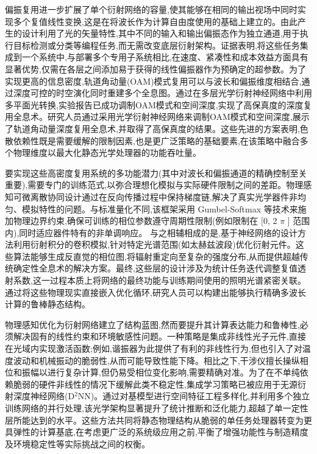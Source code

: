 \documentclass[11pt]{article}
\begin{document}
偏振复用进一步扩展了单个衍射网络的容量,使其能够在相同的输出视场中同时实现多个复值线性变换,这是在将波长作为计算自由度使用的基础上建立的。由此产生的设计利用了光的矢量特性,其中不同的输入和输出偏振态作为独立通道,用于执行目标检测或分类等编程任务,而无需改变底层衍射架构。证据表明,将这些任务集成到一个系统中,与部署多个专用子系统相比,在速度、紧凑性和成本效益方面具有显著优势,仅需在各层之间添加易于获得的线性偏振器作为预确定的超参数。为了实现更高的信息密度,轨道角动量(OAM)模式复用可以与波长和偏振维度相结合,通过深度可控的时空演化同时重建多个全息图。通过在多层光学衍射神经网络中利用多平面光转换,实验报告已成功调制OAM模式和空间深度,实现了高保真度的深度复用全息术。研究人员通过采用光学衍射神经网络来调制OAM模式和空间深度,展示了轨道角动量深度复用全息术,并取得了高保真度的结果。\citep{doi_10_1364_oe_447337_61ffab71}这些先进的方案表明,色散依赖性既是需要缓解的限制因素,也是更广泛策略的基础要素,在该策略中融合多个物理维度以最大化静态光学处理器的功能吞吐量。\citep{doi_10_1038_s41377_022_00849_x_e31226af} \citep{doi_10_1364_oe_447337_61ffab71}

要实现这些高密度复用系统的多功能潜力(其中对波长和偏振通道的精确控制至关重要),需要专门的训练范式,以弥合理想化模拟与实际硬件限制之间的差距。物理感知可微离散协同设计通过在反向传播过程中保持梯度链,解决了真实光学器件非均匀、模拟特性的问题。与标准量化不同,该框架采用 Gumbel-Softmax 等技术来施加物理边界约束,确保可训练的相位参数遵守周期性限制(例如限制在 {[}0, 2 \(\pi\) {]} 范围内),同时适应器件特有的非单调响应。\citep{doi_10_1145_3508352_3549378_13c53996} 与之相辅相成的是,基于神经网络的设计方法利用衍射积分的卷积模拟,针对特定光谱范围(如太赫兹波段)优化衍射元件。这些算法能够生成反直觉的相位图,将辐射重定向至复杂的强度分布,从而提供超越传统确定性全息术的解决方案。最终,这些层的设计涉及为统计任务迭代调整复值透射系数,这一过程本质上将网络的最终功能与训练期间使用的照明光谱紧密关联。通过将这些物理现实直接嵌入优化循环,研究人员可以构建出能够执行精确多波长计算的鲁棒静态结构。\citep{doi_10_1145_3508352_3549378_13c53996} \citep{doi_10_1109_tthz_2023_3344020_a0a550ba} \citep{doi_10_1021_acsphotonics_0c01583_7c90196c}

物理感知优化为衍射网络建立了结构蓝图,然而要提升其计算表达能力和鲁棒性,必须解决固有的线性约束和环境敏感性问题。一种策略是集成非线性光子元件,直接在光域内实现激活函数;例如,谐振器为此提供了有利的非线性行为,但也引入了对温度波动和机械振动的脆弱性,从而可能导致性能下降。相比之下,干涉仪擅长操纵相位和振幅以进行复杂计算,但仍易受相位变化影响,需要精确对准。为了在不单纯依赖脆弱的硬件非线性的情况下缓解此类不稳定性,集成学习策略已被应用于无源衍射深度神经网络(D\(^{2}\)NN)。通过对基模型进行空间特征工程多样化,并利用多个独立训练网络的并行处理,该光学架构显著提升了统计推断和泛化能力,超越了单一定性层所能达到的水平。这些方法共同将静态物理结构从脆弱的单任务处理器转变为更具弹性的计算基底,在考虑更广泛的系统级应用之前,平衡了增强功能性与制造精度及环境稳定性等实际挑战之间的权衡。\citep{doi_10_3390_nano14080697_c372a140} \citep{doi_10_1038_s41377_020_00446_w_c890b40c}
\end{document}
